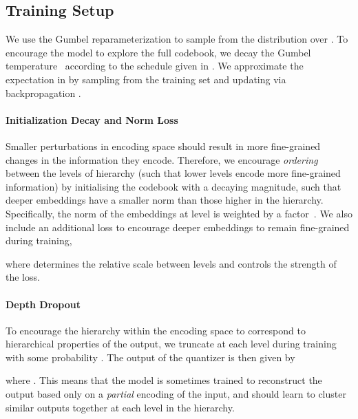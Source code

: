 \documentclass[11pt]{article}
\begin{document}
\subsection{Training Setup} 

We use the Gumbel reparameterization
\cite{jang2016categorical,maddison2017concrete,sonderby2017continuous}
to sample from the distribution over . To encourage the model to explore the full codebook, we decay the Gumbel temperature~ according to the schedule given in . We approximate the expectation in
 by sampling from the training set and
updating via backpropagation \cite{kingma2013autoencoding}.




\paragraph{Initialization Decay and Norm Loss} Smaller perturbations in encoding space should result in more fine-grained changes in the information they encode. Therefore, we encourage \textit{ordering} between the levels of hierarchy (such that lower levels encode more fine-grained information) by initialising the codebook with a decaying magnitude, such that deeper embeddings have a smaller norm than those higher in the hierarchy. Specifically, the norm of the embeddings at level  is weighted by a factor~. We also include an additional loss  to encourage deeper embeddings to remain fine-grained during training, 

where  determines the relative scale between levels and  controls the strength of the loss.

\paragraph{Depth Dropout} To encourage the hierarchy within the encoding space to correspond to hierarchical properties of the output, we truncate at each level during training with some probability  \cite{hosking-etal-2022-hierarchical,10.1109/TASLP.2021.3129994}. The output of the quantizer is then given by 

where . This means that the model is sometimes trained to reconstruct the output based only on a \textit{partial} encoding of the input, and should learn to cluster similar outputs together at each level in the hierarchy.
\end{document}
